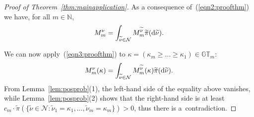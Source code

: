 \documentclass[pdftex]{sigma}
\numberwithin{equation}{section}
\newcommand{\N}{\mathbb{N}}
\newcommand{\Nu}{\mathcal{N}}
\newcommand{\GT}{\mathbb{GT}}
\begin{document}
\begin{proof}[Proof of Theorem~\ref{thm:mainapplication}]
As a consequence of~(\ref{eqn2:proofthm}) we have, for all $m\in\N$,
\begin{gather}\label{eqn3:proofthm}
M_m^{\nu} = \int_{\widetilde{\nu}\in\Nu}{M_m^{\widetilde{\nu}}\widetilde{\pi}({\rm d}\widetilde{\nu})}.
\end{gather}

We can now apply~(\ref{eqn3:proofthm}) to $\kappa = (\kappa_m \geq \dots \geq \kappa_1)\in\GT_m$:
\begin{gather*}
M_m^{\nu}(\kappa) = \int_{\widetilde{\nu}\in\Nu}{M_m^{\widetilde{\nu}}(\kappa)\widetilde{\pi}({\rm d}\widetilde{\nu})}.
\end{gather*}
From Lemma~\ref{lem:posprob}(1), the left-hand side of the equality above vanishes, while Lemma~\ref{lem:posprob}(2) shows that the right-hand side is at least $c_m \cdot \widetilde{\pi} ( \{\widetilde{\nu}\in\Nu \colon\widetilde{\nu}_1 = \kappa_1, \dots, \widetilde{\nu}_m = \kappa_m\} ) > 0$, thus there is a~contradiction.


\end{proof}
\end{document}
